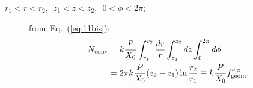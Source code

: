\begin{description}
%
%
\item[$r_1<r<r_2$,~$\, z_1<z<z_2$,~$\, 0<\phi<2\pi$;]
  from~Eq.~(\ref{eq:11bis}): 
\begin{equation}
\begin{split}
N_{\rm conv} & = k
\frac{P}{X_0} \int_{r_1}^{r_2} \frac{dr}{r} \int_{z_1}^{z_2} dz
\int_0^{2\pi} d\phi = \\
& = 2\pi k \frac{P}{X_0}  (z_2 - z_1) \ln \frac{r_2}{r_1} \equiv k \frac{P}{X_0} f^{r, z}_{\rm geom}.\\
\end{split}
\label{eq:13}
\end{equation}
%
%

\end{description}
